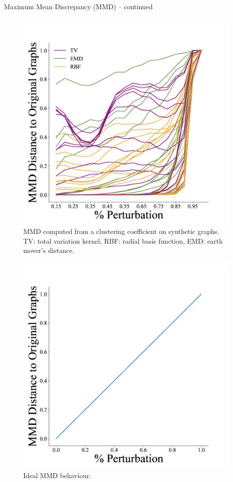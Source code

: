 \documentclass[aspectratio=169, 10pt, dvipsnames]{beamer}
\begin{document}
\begin{frame}[fragile]{Maximum Mean Discrepancy (MMD) -- continued}
\begin{minipage}{0.68\textwidth}
  \end{minipage}
  \hfill
  \begin{minipage}{0.28\textwidth}
  \begin{figure}
    \centering
    \includegraphics[width=.7\textwidth]{./figures/leslie_work.pdf}
    \caption{MMD computed from a clustering coefficient on synthetic graphs. TV:
    total variation kernel, RBF: radial basis function, EMD: earth mover's distance.}
\end{figure}
\vspace{-14pt}
  \begin{figure}
    \centering
    \includegraphics[width=.7\textwidth]{./figures/ideal.pdf}
    \caption{Ideal MMD behaviour.}
  \end{figure}
  \end{minipage}
\end{frame}
\end{document}
